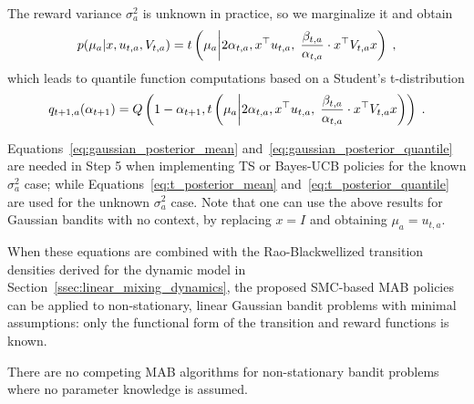 The reward variance $\sigma^2_a$ is unknown in practice,
so we marginalize it and obtain
\begin{equation}
\begin{split}
p(\mu_{a}|x, u_{t,a}, V_{t,a}) = t\left( \mu_{a} \middle|2\alpha_{t,a}, x^\top u_{t,a}, \; \frac{\beta_{t,a}}{\alpha_{t,a}} \cdot x^\top V_{t,a} x\right) \;, 
\end{split}
\label{eq:t_posterior_mean}
\end{equation}
which leads to quantile function computations based on a Student's t-distribution
\begin{equation}
q_{t+1,a}(\alpha_{t+1})=Q\left(1-\alpha_{t+1}, t\left( \mu_{a} \middle| 2\alpha_{t,a}, x^\top u_{t,a}, \; \frac{\beta_{t,a}}{\alpha_{t,a}} \cdot x^\top V_{t,a} x\right)\right) \;.
\label{eq:t_posterior_quantile}
\end{equation}

Equations~\eqref{eq:gaussian_posterior_mean} and~\eqref{eq:gaussian_posterior_quantile}
are needed in Step 5 when implementing TS or Bayes-UCB policies for the known $\sigma_a^2$ case;
while Equations~\eqref{eq:t_posterior_mean} and~\eqref{eq:t_posterior_quantile} are used for the unknown $\sigma_a^2$ case.
Note that one can use the above results for Gaussian bandits with no context, by replacing $x=I$ and obtaining $\mu_{a}=u_{t,a}$.

When these equations are combined
with the Rao-Blackwellized transition densities derived for the dynamic model in Section~\ref{ssec:linear_mixing_dynamics},
the proposed SMC-based MAB policies can be applied to non-stationary, linear Gaussian bandit problems with minimal assumptions:
\ie only the functional form of the transition and reward functions is known.

There are no competing MAB algorithms
for non-stationary bandit problems where no parameter knowledge is assumed.